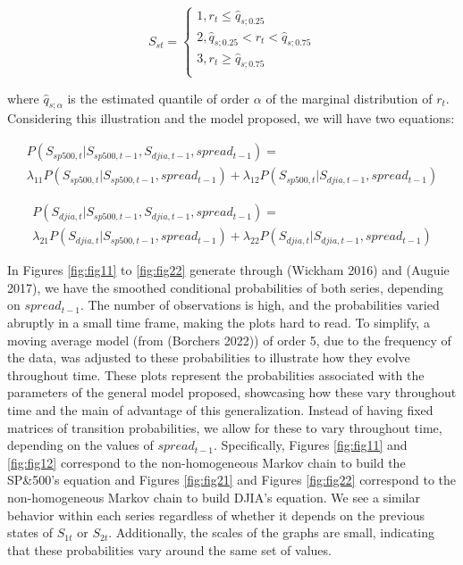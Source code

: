 \[
S_{st}=
\begin{cases}
1, r_t \leq \widehat{q}_{s;0.25}\\
2, \widehat{q}_{s;0.25} < r_t < \widehat{q}_{s;0.75} \\
3, r_t \geq \widehat{q}_{s;0.75}\\
\end{cases}
\]

where \(\widehat{q}_{s;\alpha}\) is the estimated quantile of order \(\alpha\) of the marginal distribution of \(r_t\). Considering this illustration and the model proposed, we will have two equations:

\begin{multline}
P(S_{sp500,t} | S_{sp500, t-1}, S_{djia, t-1}, spread_{t-1}) = \\ \lambda_{11} P(S_{sp500,t} | S_{sp500, t-1}, spread_{t-1}) + \lambda_{12} P(S_{sp500,t} | S_{djia, t-1}, spread_{t-1}) \label{eq:eq13}
\end{multline}

\begin{multline}
P(S_{djia,t} | S_{sp500, t-1}, S_{djia, t-1}, spread_{t-1}) = \\ \lambda_{21} P(S_{djia,t} | S_{sp500, t-1}, spread_{t-1}) + \lambda_{22} P(S_{djia,t} | S_{djia, t-1}, spread_{t-1}) \label{eq:eq14}
\end{multline}

In Figures \ref{fig:fig11} to \ref{fig:fig22} generate through  (Wickham 2016) and  (Auguie 2017), we have the smoothed conditional probabilities of both series, depending on \(spread_{t-1}\). The number of observations is high, and the probabilities varied abruptly in a small time frame, making the plots hard to read. To simplify, a moving average model (from  (Borchers 2022)) of order 5, due to the frequency of the data, was adjusted to these probabilities to illustrate how they evolve throughout time. These plots represent the probabilities associated with the parameters of the general model proposed, showcasing how these vary throughout time and the main of advantage of this generalization. Instead of having fixed matrices of transition probabilities, we allow for these to vary throughout time, depending on the values of \(spread_{t-1}\). Specifically, Figures \ref{fig:fig11} and \ref{fig:fig12} correspond to the non-homogeneous Markov chain to build the SP\&500's equation and Figures \ref{fig:fig21} and Figures \ref{fig:fig22} correspond to the non-homogeneous Markov chain to build DJIA's equation. We see a similar behavior within each series regardless of whether it depends on the previous states of \(S_{1t}\) or \(S_{2t}\). Additionally, the scales of the graphs are small, indicating that these probabilities vary around the same set of values.

